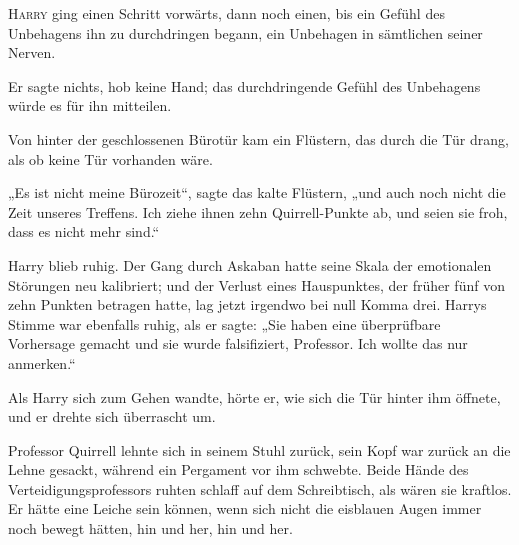 
\lettrine{H}{arry} ging einen Schritt vorwärts, dann noch einen, bis ein Gefühl des Unbehagens ihn zu durchdringen begann, ein Unbehagen in sämtlichen seiner Nerven.

Er sagte nichts, hob keine Hand; das durchdringende Gefühl des Unbehagens würde es für ihn mitteilen.

Von hinter der geschlossenen Bürotür kam ein Flüstern, das durch die Tür drang, als ob keine Tür vorhanden wäre.

„Es ist nicht meine Bürozeit“, sagte das kalte Flüstern, „und auch noch nicht die Zeit unseres Treffens. Ich ziehe ihnen zehn Quirrell-Punkte ab, und seien sie froh, dass es nicht mehr sind.“

Harry blieb ruhig. Der Gang durch Askaban hatte seine Skala der emotionalen Störungen neu kalibriert; und der Verlust eines Hauspunktes, der früher fünf von zehn Punkten betragen hatte, lag jetzt irgendwo bei null Komma drei. Harrys Stimme war ebenfalls ruhig, als er sagte:
„Sie haben eine überprüfbare Vorhersage gemacht und sie wurde falsifiziert, Professor. Ich wollte das nur anmerken.“

Als Harry sich zum Gehen wandte, hörte er, wie sich die Tür hinter ihm öffnete, und er drehte sich überrascht um.

Professor Quirrell lehnte sich in seinem Stuhl zurück, sein Kopf war zurück an die Lehne gesackt, während ein Pergament vor ihm schwebte. Beide Hände des Verteidigungsprofessors ruhten schlaff auf dem Schreibtisch, als wären sie kraftlos. Er hätte eine Leiche sein können, wenn sich nicht die eisblauen Augen immer noch bewegt hätten, hin und her, hin und her.


